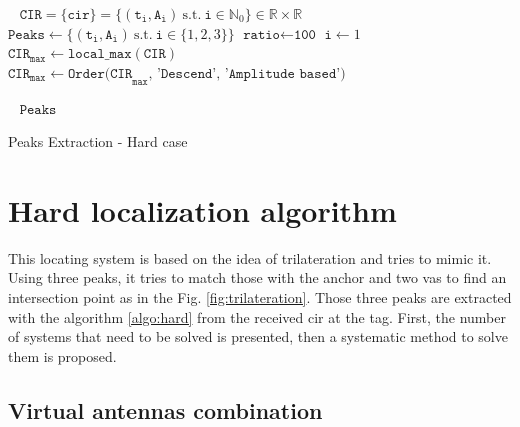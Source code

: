 \begin{algorithm}[H]
 \KwInput{}\
 \hspace*{\algorithmicindent} $\mathtt{CIR} = \{\mathtt{cir}\} = \{ (\mathtt{t_i}, \mathtt{A_i}) ~\text{s.t.} ~\mathtt{i} \in \mathbb{N}_0\} \in \mathbb{R} \times \mathbb{R}$ \;
\KwInit{}
\hspace*{\algorithmicindent} $\texttt{Peaks} \longleftarrow \{ (\mathtt{t_i}, \mathtt{A_i}) ~\text{s.t.} ~\mathtt{i} \in \{ 1, 2, 3 \} \}$\;
\hspace*{\algorithmicindent} $\texttt{ratio} \longleftarrow \texttt{100}$\;
\hspace*{\algorithmicindent} $\texttt{i} \longleftarrow 1$\;
\hspace*{\algorithmicindent} $\texttt{CIR}_\texttt{max} \longleftarrow \texttt{local\_max}(\texttt{CIR})$\;
\hspace*{\algorithmicindent} $\texttt{CIR}_\texttt{max} \longleftarrow \texttt{Order(CIR}_\texttt{max}\texttt{, 'Descend', 'Amplitude based')}$\;


 \KwOutput{}\
 \hspace*{\algorithmicindent} $\texttt{Peaks}$\;
 \caption{Peaks Extraction - Hard case \label{algo:hard}}
\end{algorithm}
\vspace{2mm}


\section{Hard localization algorithm}
\label{hard_loc}
This locating system is based on the idea of trilateration and tries to mimic it. Using three peaks, it tries to match those with the anchor and two \glspl{va} to find an intersection point as in the Fig. \ref{fig:trilateration}. Those three peaks are extracted with the algorithm \ref{algo:hard} from the received \gls{cir} at the tag. First, the number of systems that need to be solved is presented, then a systematic method to solve them is proposed.

\subsection{Virtual antennas combination}

